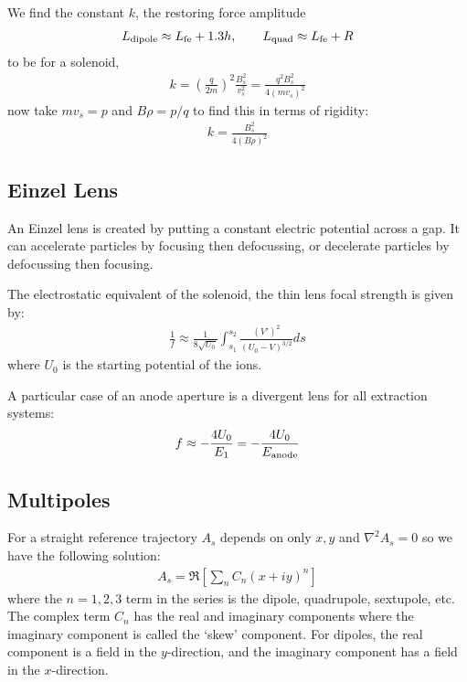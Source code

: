 \documentclass{article}
\numberwithin{equation}{section}
\begin{document}
We find the constant $k$, the restoring force amplitude\begin{align}
L_{\rm dipole} \approx L_{\rm fe} + 1.3 h ,\qquad
L_{\rm quad} \approx L_{\rm fe} + R
\end{align} to be for a solenoid, 
\begin{align}
k = \left( \frac{q}{2m}\right)^2 \frac{B_s^2}{v_s^2} = \frac{ q^2 B_s^2}{4 (m v_s)^2}
\end{align}
now take $mv_s = p$ and $B\rho = p/q$ to find this in terms of rigidity:
\begin{align}
k = \frac{B_s^2}{4(B \rho)^2}
\end{align}

\subsection{Einzel Lens}
An Einzel lens is created by putting a constant electric potential across a gap. It can accelerate particles by focusing then defocussing, or decelerate particles by defocussing then focusing. 

The electrostatic equivalent of the solenoid, the thin lens focal strength is given by:
\begin{align}
\frac{1}{f} \approx \frac{1}{8\sqrt{U_0}} \int_{s_1}^{s_2} \frac{(V')^2}{(U_0-V)^{3/2}}ds
\end{align}
where $U_0$ is the starting potential of the ions. 

A particular case of an anode aperture is a divergent lens for all extraction systems:
\begin{align}
f \approx -\frac{4U_0}{E_1} = - \frac{4U_0}{E_{\rm anode}}
\end{align}

\subsection{ Multipoles }
For a straight reference trajectory $A_s$ depends on only $x,y$ and $\nabla^2 A_s = 0$ so we have the following solution:
\begin{align}
A_s = \Re \left[ \sum_n C_n (x + iy)^n \right]
\end{align}
where the $n = 1,2,3$ term in the series is the dipole, quadrupole, sextupole, etc. The complex term $C_n$ has the real and imaginary components where the imaginary component is called the `skew' component. For dipoles, the real component is a field in the $y$-direction, and the imaginary component has a field in the $x$-direction.
\end{document}
